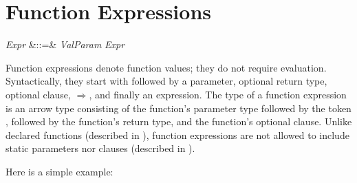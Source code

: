 %
%
%
%

\section{Function Expressions}



\begin{Grammar}
\emph{Expr} &::=&
 \emph{ValParam}   \EXP{\Rightarrow} \emph{Expr}\\
\end{Grammar}

Function expressions denote function values; they do not
require evaluation.  Syntactically,
they start with  followed by a parameter,
optional return type,
optional  clause,
$\Rightarrow$, and finally an expression.
The type of a function expression is an arrow type consisting of the
function's parameter type followed by the token \EXP{\rightarrow},
followed by the function's return type,
and the function's  optional  clause.
Unlike declared functions (described in
), function expressions are not
allowed to include static parameters
nor  clauses (described in ).


Here is a simple example:

